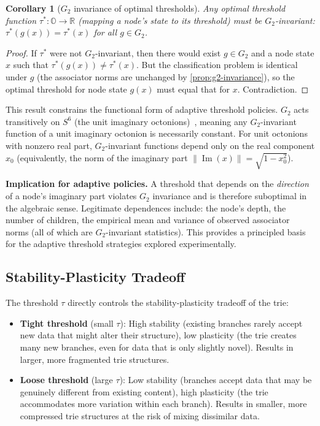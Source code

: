 \documentclass[11pt,a4paper]{article}
\newtheorem{corollary}[theorem]{Corollary}
\theoremstyle{definition}
\theoremstyle{remark}
\DeclareMathOperator{\Ima}{Im}
\newcommand{\Oct}{\mathbb{O}}
\newcommand{\Real}{\mathbb{R}}
\begin{document}
\begin{corollary}[$G_2$ invariance of optimal thresholds]
\label{cor:g2-threshold}
Any optimal threshold function $\tau^*: \Oct \to \Real$ (mapping a node's state to its threshold) must be $G_2$-invariant: $\tau^*(g(x)) = \tau^*(x)$ for all $g \in G_2$.
\end{corollary}

\begin{proof}
If $\tau^*$ were not $G_2$-invariant, then there would exist $g \in G_2$ and a node state $x$ such that $\tau^*(g(x)) \neq \tau^*(x)$. But the classification problem is identical under $g$ (the associator norms are unchanged by \cref{prop:g2-invariance}), so the optimal threshold for node state $g(x)$ must equal that for $x$. Contradiction.
\end{proof}

This result constrains the functional form of adaptive threshold policies. $G_2$ acts transitively on $S^6$ (the unit imaginary octonions)~\citep{Harvey1990}, meaning any $G_2$-invariant function of a unit imaginary octonion is necessarily constant. For unit octonions with nonzero real part, $G_2$-invariant functions depend only on the real component $x_0$ (equivalently, the norm of the imaginary part $\lVert \Ima(x) \rVert = \sqrt{1 - x_0^2}$).

\textbf{Implication for adaptive policies.} A threshold that depends on the \emph{direction} of a node's imaginary part violates $G_2$ invariance and is therefore suboptimal in the algebraic sense. Legitimate dependences include: the node's depth, the number of children, the empirical mean and variance of observed associator norms (all of which are $G_2$-invariant statistics). This provides a principled basis for the adaptive threshold strategies explored experimentally.

\subsection{Stability-Plasticity Tradeoff}
\label{sec:stability-plasticity}

The threshold $\tau$ directly controls the stability-plasticity tradeoff of the trie:

\begin{itemize}[nosep]
  \item \textbf{Tight threshold} (small $\tau$): High stability (existing branches rarely accept new data that might alter their structure), low plasticity (the trie creates many new branches, even for data that is only slightly novel). Results in larger, more fragmented trie structures.
  \item \textbf{Loose threshold} (large $\tau$): Low stability (branches accept data that may be genuinely different from existing content), high plasticity (the trie accommodates more variation within each branch). Results in smaller, more compressed trie structures at the risk of mixing dissimilar data.
\end{itemize}
\end{document}
